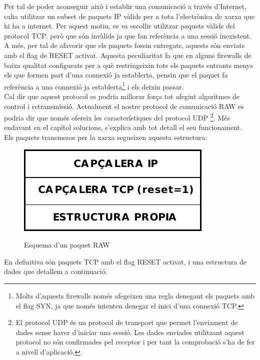 Per tal de poder aconseguir això i establir una comunicació a través d'Internet, calia utilitzar un subset de 
paquets IP vàlids per a tota l'electrònica de xarxa que hi ha a internet. Per aquest motiu, es va escollir
utilitzar paquets vàlids del protocol TCP, però que són invàlids ja que fan referència a una sessió inexistent.
A més, per tal de afavorir que els paquets fossin entregats, aquests són enviats amb el flag de RESET activat. 
Aquesta peculiaritat fa que en alguns firewalls de baixa qualitat configurats per a què restringeixin 
tots els paquets entrants menys els que formen part d'una connexió ja establerta, pensin que el paquet
fa referència a una connexió ja establerta\footnote{Molts d'aquests firewalls només afegeixen una regla denegant
els paquets amb el flag SYN, ja que només intenten denegar el inici d'una connexió TCP.} i els deixin passar. \\

Cal dir que aquest protocol es podria millorar força tot afegint algoritmes de control i retransmissió. Actualment
el nostre protocol de comunicació RAW es podria dir que només ofereix les característiques del protocol UDP
\footnote{El protocol UDP és un protocol de transport que permet l'enviament de dades sense haver d'iniciar una 
sessió. Les dades enviades utilitzant aquest protocol no són confirmades pel receptor i per tant la comprobació
s'ha de fer a nivell d'aplicació.}. Més endavant en el capítol solucions, s'explica amb tot detall el seu funcionament. \\

Els paquets transmesos per la xarxa segueixen aquesta estructura: \\

\begin{figure}[htp]
    \centering
    \includegraphics[scale=1,keepaspectratio]{diagrames/solutionDesignPacketStructure.pdf} \\
    \caption{Esquema d'un paquet RAW}
    \label{fig:packetScheme}
\end{figure}

En definitiva són paquets TCP amb el flag RESET activat, i una estructura de dades que detallem a continuació.


